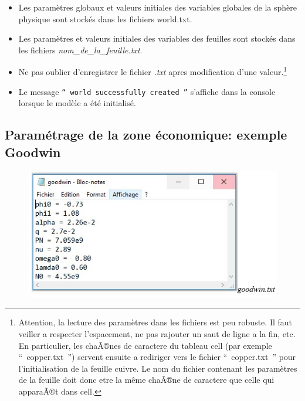 \documentclass[12pt,a4paper]{article}%
\begin{document}
\begin{itemize}
\item Les paramètres globaux et valeurs initiales des variables globales
de la sphère physique sont stockés dans les fichiers world.txt.

\item Les paramètres et valeurs initiales des variables des feuilles sont
stockés dans les fichiers \textit{nom\_de\_la\_feuille.txt}.

\item Ne pas oublier d'enregistrer le fichier \textit{.txt} apres modification d'une
valeur.\footnote{Attention, la lecture des paramètres dans les fichiers est
{peu robuste}. Il faut veiller a respecter l'espacement, ne pas rajouter un
saut de ligne a la fin, etc. En particulier, les chaÃ®nes de caractere du
tableau cell (par exemple ``~copper.txt~'') servent ensuite a rediriger vers le
fichier ``~copper.txt~'' pour l'initialisation de la feuille cuivre. Le nom du
fichier contenant les paramètres de la feuille doit donc etre la même chaÃ®ne
de caractere que celle qui apparaÃ®t dans cell.}

\item Le message \texttt{``~world successfully created~''} s'affiche dans la console
lorsque le modèle a été initialisé.
\end{itemize}

\subsection{Paramétrage de la zone économique: exemple Goodwin}

\begin{figure}[h]
\centering
\includegraphics[width=1.0\textwidth]{figures/Goodwin-txt.jpg}\end{figure}
\end{document}

